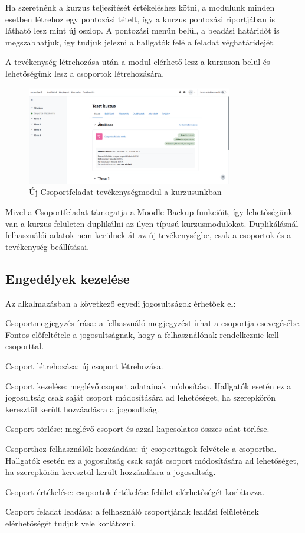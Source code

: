 Ha szeretnénk a kurzus teljesítését értékeléshez kötni, a modulunk minden esetben létrehoz egy pontozási tételt, így a kurzus pontozási riportjában is látható lesz mint új oszlop. A pontozási menün belül, a beadási határidőt is megszabhatjuk, így tudjuk jelezni a hallgatók felé a feladat véghatáridejét.

A tevékenység létrehozása után a modul elérhető lesz a kurzuson belül és lehetőségünk lesz a csoportok létrehozására.

\begin{figure}[H]
	\centering
	\includegraphics[width=0.8\textwidth,frame]{images/tevekenyseg_nezet.png}
	\caption{Új Csoportfeladat tevékenységmodul a kurzusunkban}
\end{figure}

Mivel a Csoportfeladat támogatja a Moodle Backup funkcióit, így lehetőségünk van a kurzus felületen duplikálni az ilyen típusú kurzusmodulokat. Duplikálásnál felhasználói adatok nem kerülnek át az új tevékenységbe, csak a csoportok és a tevékenység beállításai.

\subsection{Engedélyek kezelése}

Az alkalmazásban a következő egyedi jogosultságok érhetőek el:
\begin{compactitem}
    	\item Csoportmegjegyzés írása: a felhasználó megjegyzést írhat a csoportja csevegésébe. Fontos előfeltétele a jogosultságnak, hogy a felhasználónak rendelkeznie kell csoporttal.
     \item Csoport létrehozása: új csoport létrehozása.
     \item Csoport kezelése: meglévő csoport adatainak módosítása. Hallgatók esetén ez a jogosultság csak saját csoport módosítására ad lehetőséget, ha szerepkörön keresztül került hozzáadásra a jogosultság.
     \item Csoport törlése: meglévő csoport és azzal kapcsolatos összes adat törlése.
     \item Csoporthoz felhasználók hozzáadása: új csoporttagok felvétele a csoportba. Hallgatók esetén ez a jogosultság csak saját csoport módosítására ad lehetőséget, ha szerepkörön keresztül került hozzáadásra a jogosultság.
     \item Csoport értékelése: csoportok értékelése felület elérhetőségét korlátozza.
     \item Csoport feladat leadása: a felhasználó csoportjának leadási felületének elérhetőségét tudjuk vele korlátozni. 
\end{compactitem}

